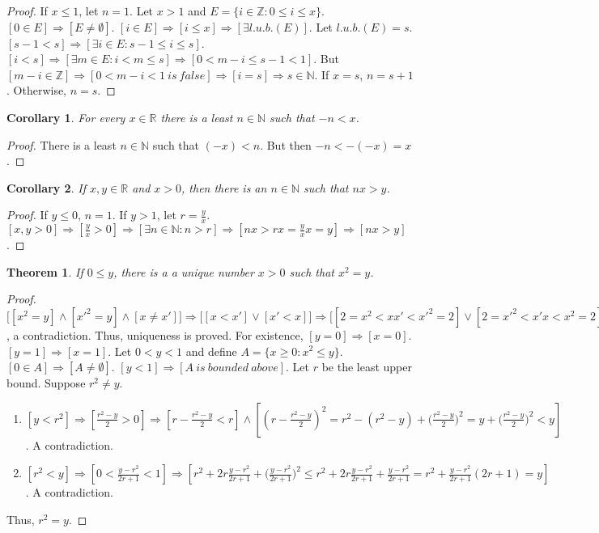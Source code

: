 \documentclass[crop=false,class=book]{standalone}
\theoremstyle{mystyle}
\newtheorem{theorem}{Theorem}[section]
\newtheorem{corollary}{Corollary}[section]
\begin{document}
\begin{proof}
If $x\leq1$, let $n=1$. Let $x>1$ and $E=\{i \in \mathbb{Z}: 0 \leq i \leq x\}$. $[0\in E]\Rightarrow [E\ne \emptyset]$. $[i\in E]\Rightarrow [i\leq x]\Rightarrow [\exists l.u.b.(E)]$. Let $l.u.b.(E)=s$. $[s-1<s]\Rightarrow [\exists i \in E:s-1 \leq i \leq s]$. $[i< s]\Rightarrow[\exists m\in E: i < m \leq s]\Rightarrow [0 < m-i \leq s-1 < 1]$. But $[m-i \in \mathbb{Z}]\Rightarrow [0<m-i<1\ is\ false]\Rightarrow [i = s]\Rightarrow s\in \mathbb{N}$. If $x=s$, $n = s+1$. Otherwise, $n=s$.
\end{proof}
\begin{corollary}
For every $x\in \mathbb{R}$ there is a least $n\in \mathbb{N}$ such that $-n<x$.
\end{corollary}
\begin{proof}
There is a least $n\in \mathbb{N}$ such that $(-x)<n$. But then $-n <-(-x) = x$. 
\end{proof}
\begin{corollary}
If $x,y\in \mathbb{R}$ and $x>0$, then there is an $n\in \mathbb{N}$ such that $nx>y$.
\end{corollary}
\begin{proof}
If $y\leq 0$, $n=1$. If $y>1$, let $r = \frac{y}{x}$. $[x,y>0]\Rightarrow [\frac{y}{x}>0]\Rightarrow [\exists n\in \mathbb{N}:n>r]\Rightarrow [nx > rx = \frac{y}{x}x = y]\Rightarrow[nx>y]$.
\end{proof}
\begin{theorem}
If $0\leq y$, there is a a unique number $x>0$ such that $x^2 = y$.
\end{theorem}
\begin{proof}
$\big[[x^2=y]\land [x'^2=y]\land [x\ne x']\big] \Rightarrow \big[[x<x']\lor[x'<x]\big] \Rightarrow \big[[2=x^2<xx'<x'^2=2]\lor[2=x'^2<x'x<x^2=2]\big]$, a contradiction. Thus, uniqueness is proved. For existence, $[y=0]\Rightarrow[x=0]$.$[y=1]\Rightarrow [x=1]$. Let $0 < y < 1$ and define $A = \{x\geq0:x^2 \leq y\}$. $[0\in A]\Rightarrow[A\ne \emptyset]$. $[y<1]\Rightarrow [A\ is\ bounded\ above]$. Let $r$ be the least upper bound. Suppose $r^2\ne y$.
\begin{enumerate}
\item $[y<r^2]\Rightarrow[\frac{r^2-y}{2}>0]\Rightarrow [r-\frac{r^2-y}{2}<r]\land[(r-\frac{r^2-y}{2})^2= r^2 - (r^2-y)+\big(\frac{r^2-y}{2}\big)^2 = y + \big(\frac{r^2-y}{2}\big)^2 < y]$. A contradiction.
\item $[r^2 <y]\Rightarrow [0<\frac{y-r^2}{2r+1}<1]\Rightarrow [r^2 + 2r\frac{y-r^2}{2r+1}+\big(\frac{y-r^2}{2r+1}\big)^2\leq r^2 + 2r\frac{y-r^2}{2r+1}+\frac{y-r^2}{2r+1} = r^2+\frac{y-r^2}{2r+1}(2r+1)=y]$. A contradiction.
\end{enumerate}
Thus, $r^2 = y$.
\end{proof}
\end{document}
